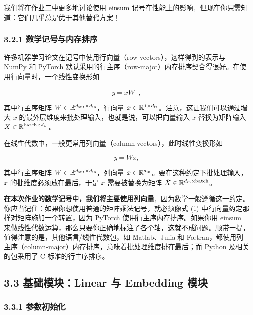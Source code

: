 我们将在作业二中更多地讨论使用 einsum 记号在性能上的影响，但现在你只需知道：它们几乎总是优于其他替代方案！

\subsubsection*{3.2.1 数学记号与内存排序}

许多机器学习论文在记号中使用行向量（row vectors），这样得到的表示与 NumPy 和 PyTorch 默认采用的行主序（row-major）内存排序契合得很好。在使用行向量时，一个线性变换形如

\begin{equation*}
y = x W^\top , \tag{1}
\end{equation*}

其中行主序矩阵 $W \in \mathbb{R}^{d_{\mathrm{out}} \times d_{\mathrm{in}}}$，行向量 $x \in \mathbb{R}^{1 \times d_{\mathrm{in}}}$。注意，这让我们可以通过增大 $x$ 的最外层维度来批处理输入，也就是说，可以把向量输入 $x$ 替换为矩阵输入 $X \in \mathbb{R}^{\mathrm{batch} \times d_{\mathrm{in}}}$。

在线性代数中，一般更常用列向量（column vectors），此时线性变换形如

\begin{equation*}
y = W x , \tag{2}
\end{equation*}

其中行主序矩阵 $W \in \mathbb{R}^{d_{\mathrm{out}} \times d_{\mathrm{in}}}$，列向量 $x \in \mathbb{R}^{d_{\mathrm{in}}}$。要在这种约定下批处理输入，$x$ 的批维度必须放在最后，于是 $x$ 需要被替换为矩阵 $\tilde{X} \in \mathbb{R}^{d_{\mathrm{in}} \times \mathrm{batch}}$。

\textbf{在本次作业的数学记号中，我们将主要使用列向量}，因为数学一般遵循这一约定。你应当记住：如果你想使用普通的矩阵乘法记号，就必须像式 (1) 中行向量约定那样对矩阵施加一个转置，因为 PyTorch 使用行主序内存排序。如果你用 einsum 来做线性代数运算，那么只要你正确地标注了各个轴，这就不成问题。顺带一提，值得注意的是，其他语言/线性代数包，如 Matlab、Julia 和 Fortran，都使用列主序（column-major）内存排序，意味着批处理维度排在最后；而 Python 及相关的包采用了 C 标准的行主序排序。

\subsection*{3.3 基础模块：Linear 与 Embedding 模块}

\subsubsection*{3.3.1 参数初始化}

